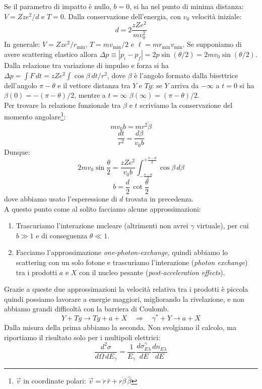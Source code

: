 \noindent Se il parametro di impatto è nullo, $b=0$, si ha nel punto di minima distanza: $V=Zz e^2 / d$ e $T=0$. Dalla conservazione dell'energia, con $v_0$ velocità iniziale:
$$d= 2\frac{zZe^2}{mv_0^2}$$
In generale: $V=Zz e^2 / r_{\min{}}$, $T=m v_{\min{}}/2$ e $\ell = m r_{\min{}}v_{\min{}}$. Se supponiamo di avere scattering elastico allora $\Delta p\equiv |p_i-p_f| = 2p \sin{(\theta/2)} = 2m v_0 \sin{(\theta/2)}$. Dalla relazione tra variazione di impulso e forza si ha $\Delta p = \int F\, dt = zZ e^2\int \cos{\beta}\: dt/r^2 $, dove $\beta$ è l'angolo formato dalla bisettrice dell'angolo $\pi - \theta$ e il vettore distanza tra $Y$ e $Tg$:  se $Y$ arriva da $-\infty$ a $t=0$ si ha $\beta(0) = - (\pi-\theta)/2$, mentre a $t=\infty$ $\beta(\infty) = (\pi-\theta)/2$.\\
Per trovare la relazione funzionale tra $\beta$ e $t$ scriviamo la conservazione del momento angolare\footnote{$\vec{v}$ in coordinate polari: $\vec{v} = \dot{r}\, \hat{r} + r \dot{\beta}\, \hat{\beta}$}:
$$m v_0 b = m r^2 \dot{\beta} $$
$$\frac{dt}{r^2} = \frac{d\beta}{v_0b}$$
Dunque:
$$2mv_0 \sin{\frac{\theta}{2}} = \frac{zZe^2}{v_0 b} \int_{-\frac{\pi-\theta}{2}}^{+\frac{\pi-\theta}{2}} \cos{\beta} \, d\beta$$
$$b = \frac{d}{2}\, \cot{\frac{\theta}{2}}$$
dove abbiamo usato l'esperessione di $d$ trovata in precedenza.\\
A questo punto come al solito facciamo alcune approssimazioni:
\begin{enumerate}
	\item Trascuriamo l'interazione nucleare (altrimenti non avrei $\gamma$ virtuale), per cui $b\gg1$ e di conseguenza $\theta\ll1$.
	\item Facciamo l'approssimazione \textit{one-photon-exchange}, quindi abbiamo lo scattering con un solo fotone e trascuriamo l'interazione (\textit{photon exchange}) tra i prodotti $a$ e $X$ con il nucleo pesante (\textit{post-acceleration effects}).%
\end{enumerate}
\noindent Grazie a queste due approssimazioni la velocità relativa tra i prodotti è piccola quindi possiamo lavorare a energie maggiori, migliorando la rivelazione, e non abbiamo grandi difficoltà con la barriera di Coulomb.
$$Y + Tg \to Tg + a + X \quad \Rightarrow \quad \gamma^* + Y \to a + X$$
Dalla misura della prima abbiamo la seconda. Non svolgiamo il calcolo, ma riportiamo il risultato solo per i multipoli elettrici:
$$\frac{d^2\sigma}{d\Omega\, dE_\gamma} = \frac{1}{E_\gamma} \frac{d \sigma_{E\lambda}^\gamma}{dE} \frac{dn_{E\lambda}}{dE}$$ 
